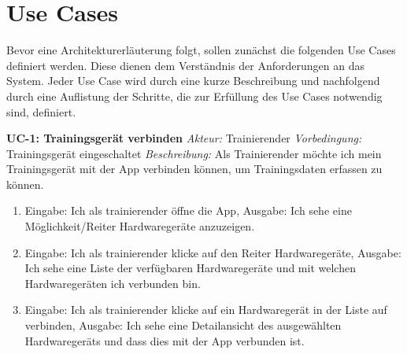 \documentclass[11pt, a4paper]{article}
\begin{document}
\vspace{.5cm}
\newpage
\section{Use Cases}
Bevor eine Architekturerläuterung folgt, sollen zunächst die folgenden Use Cases definiert werden. Diese dienen dem Verständnis der Anforderungen an das System. Jeder Use Case wird durch eine kurze Beschreibung und nachfolgend durch eine Auflistung der Schritte, die zur Erfüllung des Use Cases notwendig sind, definiert.

\vspace{0.5cm}
\textbf{UC-1: Trainingsger\"at verbinden} \vspace{.25cm} \newline 
\textit{Akteur:} Trainierender \quad 
\textit{Vorbedingung:} Trainingsger\"at eingeschaltet \newline
\textit{Beschreibung:} Als Trainierender m\"ochte ich mein Trainingsger\"at mit der App verbinden k\"onnen, um Trainingsdaten erfassen zu k\"onnen.
\begin{enumerate}[nosep]
    \item Eingabe: Ich als trainierender öffne die App, Ausgabe: Ich sehe eine Möglichkeit/Reiter Hardwaregeräte anzuzeigen.
    \item Eingabe: Ich als trainierender klicke auf den Reiter Hardwaregeräte, Ausgabe: Ich sehe eine Liste der verfügbaren Hardwaregeräte und mit welchen Hardwaregeräten ich verbunden bin.
    \item Eingabe: Ich als trainierender klicke auf ein Hardwaregerät in der Liste auf verbinden, Ausgabe: Ich sehe eine Detailansicht des ausgewählten Hardwaregeräts und dass dies mit der App verbunden ist.
\end{enumerate}

\vspace{0.5cm}
\end{document}
